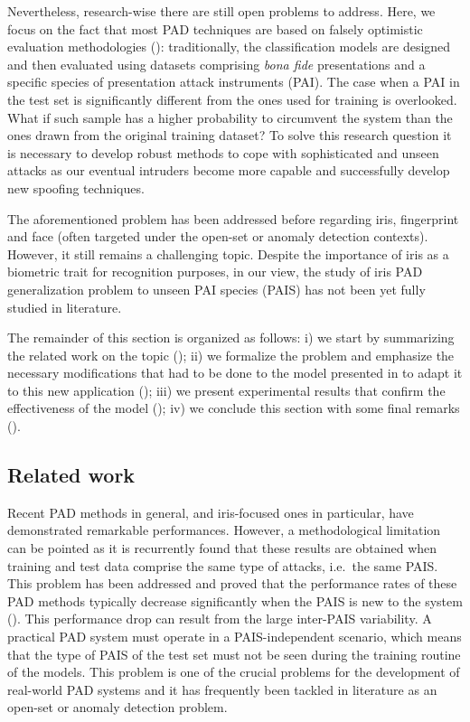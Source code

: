 Nevertheless, research-wise there are still open problems to address. Here, we focus on the fact that most PAD techniques are based on falsely optimistic evaluation methodologies (\citet{sequeira2016realistic}): traditionally, the classification models are designed and then evaluated using datasets comprising \emph{bona fide} presentations and a specific species of presentation attack instruments (PAI). The case when a PAI in the test set is significantly different from the ones used for training is overlooked. What if such sample has a higher probability to circumvent the system than the ones drawn from the original training dataset? To solve this research question it is necessary to develop robust methods to cope with sophisticated and unseen attacks as our eventual intruders become more capable and successfully develop new spoofing techniques.

The aforementioned problem has been addressed before regarding iris, fingerprint and face (often targeted under the open-set or anomaly detection contexts). However, it still remains a challenging topic. Despite the importance of iris as a biometric trait for recognition purposes, in our view, the study of iris PAD generalization problem to unseen PAI species (PAIS) has not been yet fully studied in literature.

The remainder of this section is organized as follows: i) we start by summarizing the related work on the topic (); ii) we formalize the problem and emphasize the necessary modifications that had to be done to the model presented in  to adapt it to this new application (); iii) we present experimental results that confirm the effectiveness of the model (); iv) we conclude this section with some final remarks ().

\subsection{Related work}
\label{sec:adv_iris_attack_rel_work}

Recent PAD methods in general, and iris-focused ones in particular, have demonstrated remarkable performances. However, a methodological limitation can be pointed as it is recurrently found that these results are obtained when training and test data comprise the same type of attacks, i.e.\ the same PAIS. This problem has been addressed and proved that the performance rates of these PAD methods typically decrease significantly when the PAIS is new to the system (\citet{marasco2011robustness,bowyer2014cosmetic,sequeira2016realistic}). This performance drop can result from the large inter-PAIS variability. A practical PAD system must operate in a PAIS-independent scenario, which means that the type of PAIS of the test set must not be seen during the training routine of the models. This problem is one of the crucial problems for the development of real-world PAD systems and it has frequently been tackled in literature as an open-set or anomaly detection problem.

